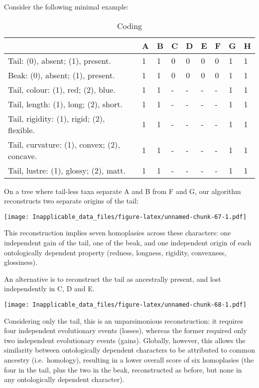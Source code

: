 \documentclass[]{book}
\theoremstyle{definition}
\theoremstyle{definition}
\theoremstyle{definition}
\theoremstyle{remark}
\begin{document}
Consider the following minimal example:

\begin{table}

\caption{\label{tab:unnamed-chunk-66}Coding}
\centering
\begin{tabular}[t]{l|l|l|l|l|l|l|l|l}
\hline
  & A & B & C & D & E & F & G & H\\
\hline
Tail: (0), absent; (1), present. & 1 & 1 & 0 & 0 & 0 & 0 & 1 & 1\\
\hline
Beak: (0), absent; (1), present. & 1 & 1 & 0 & 0 & 0 & 0 & 1 & 1\\
\hline
Tail, colour: (1), red; (2), blue. & 1 & 1 & - & - & - & - & 1 & 1\\
\hline
Tail, length: (1), long; (2), short. & 1 & 1 & - & - & - & - & 1 & 1\\
\hline
Tail, rigidity: (1), rigid; (2), flexible. & 1 & 1 & - & - & - & - & 1 & 1\\
\hline
Tail, curvature: (1), convex; (2), concave. & 1 & 1 & - & - & - & - & 1 & 1\\
\hline
Tail, lustre: (1), glossy; (2), matt. & 1 & 1 & - & - & - & - & 1 & 1\\
\hline
\end{tabular}
\end{table}

On a tree where tail-less taxa separate A and B from F and G, our
algorithm reconstructs two separate origins of the tail:

\texttt{[image: Inapplicable\_data\_files/figure-latex/unnamed-chunk-67-1.pdf]}

This reconstruction implies seven homoplasies across these characters:
one independent gain of the tail, one of the beak, and one independent
origin of each ontologically dependent property (redness, longness,
rigidity, convexness, glossiness).

An alternative is to reconstruct the tail as ancestrally present, and
lost independently in C, D and E.

\texttt{[image: Inapplicable\_data\_files/figure-latex/unnamed-chunk-68-1.pdf]}

Considering only the tail, this is an unparsimonious reconstruction: it
requires four independent evolutionary events (losses), whereas the
former required only two independent evolutionary events (gains).
Globally, however, this allows the similarity between ontologically
dependent characters to be attributed to common ancestry
(i.e.~homology), resulting in a lower overall score of six homoplasies
(the four in the tail, plus the two in the beak, reconstructed as
before, but none in any ontologically dependent character).
\end{document}
